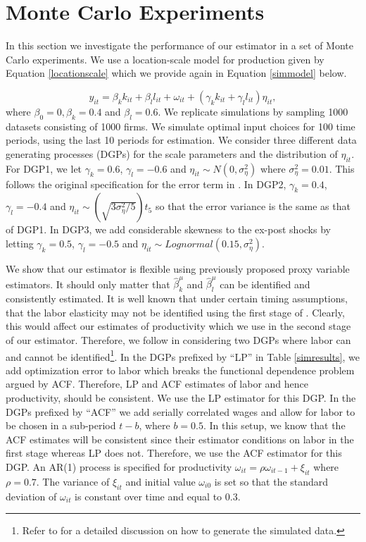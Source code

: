\documentclass[11pt]{article}
\begin{document}
\section{Monte Carlo Experiments} \label{montecarlo}
In this section we investigate the performance of our estimator in a set of Monte Carlo experiments. We use a location-scale model for production given by Equation \eqref{locationscale} which we provide again in Equation \eqref{simmodel} below.

\begin{equation} \label{simmodel}
y_{it}=\beta_{k}k_{it}+\beta_{l}l_{it}+\omega_{it}+(\gamma_{k}k_{it}+\gamma_{l}l_{it})\eta_{it},
\end{equation}
where $\beta_{0}=0, \beta_{k}=0.4$ and $\beta_{l}=0.6$. We replicate \cite{Ackerberg2015} simulations by sampling 1000 datasets consisting of 1000 firms. We simulate optimal input choices for 100 time periods, using the last 10 periods for estimation. We consider three different data generating processes (DGPs) for the scale parameters and the distribution of $\eta_{it}$. For DGP1, we let $\gamma_{k}=0.6$, $\gamma_{l}=-0.6$ and $\eta_{it}\sim N(0,\sigma_{\eta}^{2})$ where $\sigma_{\eta}^{2}=0.01$. This follows the original specification for the error term in \cite{Ackerberg2015}. In DGP2, $\gamma_{k}=0.4$, $\gamma_{l}=-0.4$ and $\eta_{it}\sim (\sqrt{3\sigma_{\eta}^{2}/5})t_{5}$ so that the error variance is the same as that of DGP1. In DGP3, we add considerable skewness to the ex-post shocks by letting $\gamma_{k}=0.5$, $\gamma_{l}=-0.5$ and $\eta_{it}\sim Lognormal(0.15,\sigma_{\eta}^{2})$. 

We show that our estimator is flexible using previously proposed proxy variable estimators. It should only matter that $\hat{\beta}_{k}^{\mu}$ and $\hat{\beta}_{l}^{\mu}$ can be identified and consistently estimated. It is well known that under certain timing assumptions, that the labor elasticity may not be identified using the first stage of \cite{Levinsohn2003}. Clearly, this would affect our estimates of productivity which we use in the second stage of our estimator. Therefore, we follow \cite{Ackerberg2015} in considering two DGPs where labor can and cannot be identified\footnote{Refer to \cite{Ackerberg2015} for a detailed discussion on how to generate the simulated data.}. In the DGPs prefixed by ``LP'' in Table \ref{simresults}, we add optimization error to labor which breaks the functional dependence problem argued by ACF. Therefore, LP and ACF estimates of labor and hence productivity, should be consistent. We use the LP estimator for this DGP. In the DGPs prefixed by ``ACF'' we add serially correlated wages and allow for labor to be chosen in a sub-period $t-b$, where $b=0.5$. In this setup, we know that the ACF estimates will be consistent since their estimator conditions on labor in the first stage whereas LP does not. Therefore, we use the ACF estimator for this DGP. An AR(1) process is specified for productivity $\omega_{it}=\rho\omega_{it-1}+\xi_{it}$ where $\rho=0.7$. The variance of $\xi_{it}$ and initial value $\omega_{i0}$ is set so that the standard deviation of $\omega_{it}$ is constant over time and equal to $0.3$. 
\end{document}
